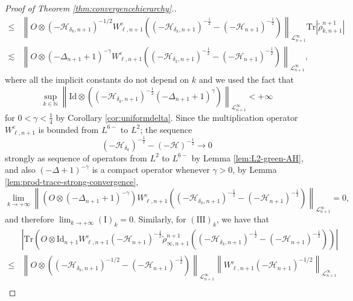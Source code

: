 \begin{proof}[Proof of Theorem \ref{thm:convergencehierarchy}.]
\begin{align*}
    \leq &\left \| O \otimes (- \mathcal{H}_{\delta_k, n+1})^{- 1 /
    2} W^{\varepsilon}_{\ell, n + 1} \left((- \mathcal{H}_{\delta_k, n+1})^{-
    \frac{1}{2}} - (- \mathcal{H}_{n+1})^{- \frac{1}{2}}\right)
    \right\|_{\mathcal{L}^{\infty}_{n + 1}} \mathrm{Tr} | \tilde{\rho}^{n + 1}_{k, n +
    1} |\\
        \lesssim & \left\| O \otimes (- \Delta_{n+1} + 1)^{- \gamma} W^{\varepsilon}_{\ell, n + 1}
    \left((- \mathcal{H}_{\delta_k, n+1})^{- \frac{1}{2}} - (- \mathcal{H}_{n +
    1})^{- \frac{1}{2}}\right) \right\|_{\mathcal{L}^{\infty}_{n + 1}},
  \end{align*}
  where all the implicit constants do not depend on $k$ and we used the fact
  that
  \[ 
  \sup_{k \in \mathbb{N}} \left\| \mathrm{Id} \otimes \left((- \mathcal{H}_{\delta_k,
     n+1})^{- \frac{1}{2}} (- \Delta_{n+1} + 1)^{\gamma}\right) \right\|_{\mathcal{L}^{\infty}_{n
     + 1}} < + \infty \]
  for $0 < \gamma < \frac{1}{4}$ by Corollary \ref{cor:uniformdelta}. Since the multiplication operator $ W^{\varepsilon}_{\ell, n + 1}$ is bounded from $L^{6-}$ to $L^2$; the sequence
  \[
  (- \mathcal{H}_{\delta_k})^{- \frac{1}{2}} - (- \mathcal{H})^{- \frac{1}{2}} \to 0
  \]
  strongly as sequence of operators from
  $L^2$ to $L^{6-}$ by Lemma
  \ref{lem:L2-green-AH}, and also
  $(- \Delta + 1)^{- \gamma}$ is a compact operator whenever $\gamma > 0$, by
  Lemma \ref{lem:prod-trace-strong-convergence},
  \[\lim_{k \rightarrow + \infty} \left\| \left(O \otimes (- \Delta_{n+1} + 1)^{- \gamma}\right)
     W^{\varepsilon}_{\ell, n + 1} \left((- \mathcal{H}_{\delta_k, n+1})^{- \frac{1}{2}} - (- \mathcal{H}_{n+1})^{- \frac{1}{2}}\right)\right \|_{\mathcal{L}^{\infty}_{n
     + 1}} = 0, \]
  and therefore $\lim_{k \rightarrow + \infty} (\mathrm{I})_k = 0$. Similarly, for $(\mathrm{I} \mathrm{I} \mathrm{I})_k$, we have that
  \begin{align*}
    & \left| \mathrm{Tr} \left(O \otimes \mathrm{Id}_{n + 1}
    W^{\varepsilon}_{\ell, n + 1} (- \mathcal{H}_{n+1})^{- \frac{1}{2}}
    \tilde{\rho}^{n + 1}_{\infty, n + 1} \left((- \mathcal{H}_{\delta_k, n +
    1})^{- \frac{1}{2}} - (- \mathcal{H}_{n+1})^{- \frac{1}{2}}\right)\right) \right|\\
    \leq &\left \| O \otimes \left((- \mathcal{H}_{\delta_k, n+1})^{- 1
    / 2} - (- \mathcal{H}_{n+1})^{- \frac{1}{2}}\right) \right\|_{\mathcal{L}^{\infty}_{n
    + 1}}\left\| W^{\varepsilon}_{\ell, n + 1} (- \mathcal{H}_{n+1})^{- 1 /
    2} \right \|_{\mathcal{L}^{\infty}_{n + 1}} \\

\end{align*}
\end{proof}
